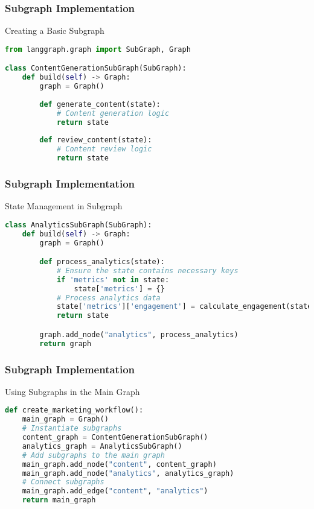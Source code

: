 \begin{frame}[fragile]\frametitle{Subgraph Implementation}

Creating a Basic Subgraph

\begin{lstlisting}[language=Python, basicstyle=\tiny]
from langgraph.graph import SubGraph, Graph

class ContentGenerationSubGraph(SubGraph):
    def build(self) -> Graph:
        graph = Graph()
        
        def generate_content(state):
            # Content generation logic
            return state
            
        def review_content(state):
            # Content review logic
            return state
\end{lstlisting}
\end{frame}

\begin{frame}[fragile]\frametitle{Subgraph Implementation}

State Management in Subgraph

\begin{lstlisting}[language=Python, basicstyle=\tiny]
class AnalyticsSubGraph(SubGraph):
    def build(self) -> Graph:
        graph = Graph()

        def process_analytics(state):
            # Ensure the state contains necessary keys
            if 'metrics' not in state:
                state['metrics'] = {}
            # Process analytics data
            state['metrics']['engagement'] = calculate_engagement(state)
            return state

        graph.add_node("analytics", process_analytics)
        return graph
\end{lstlisting}
\end{frame}


\begin{frame}[fragile]\frametitle{Subgraph Implementation}

Using Subgraphs in the Main Graph

\begin{lstlisting}[language=Python, basicstyle=\tiny]
def create_marketing_workflow():
    main_graph = Graph()
    # Instantiate subgraphs
    content_graph = ContentGenerationSubGraph()
    analytics_graph = AnalyticsSubGraph()
    # Add subgraphs to the main graph
    main_graph.add_node("content", content_graph)
    main_graph.add_node("analytics", analytics_graph)
    # Connect subgraphs
    main_graph.add_edge("content", "analytics")
    return main_graph
\end{lstlisting}
\end{frame}

